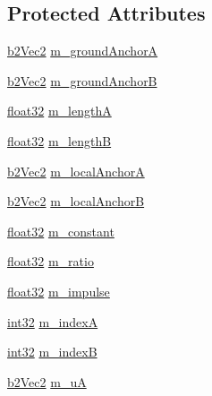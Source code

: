 \subsection*{Protected Attributes}
\begin{DoxyCompactItemize}
\item 
\mbox{\hyperlink{structb2_vec2}{b2\+Vec2}} \mbox{\hyperlink{classb2_pulley_joint_a13456d1c62a4e96e8247988152be4166}{m\+\_\+ground\+AnchorA}}
\item 
\mbox{\hyperlink{structb2_vec2}{b2\+Vec2}} \mbox{\hyperlink{classb2_pulley_joint_a9cc8195bf4e2d53606db0b49d9fc1cbc}{m\+\_\+ground\+AnchorB}}
\item 
\mbox{\hyperlink{b2_settings_8h_aacdc525d6f7bddb3ae95d5c311bd06a1}{float32}} \mbox{\hyperlink{classb2_pulley_joint_a26f2565f804692553e6b96e58621dbc9}{m\+\_\+lengthA}}
\item 
\mbox{\hyperlink{b2_settings_8h_aacdc525d6f7bddb3ae95d5c311bd06a1}{float32}} \mbox{\hyperlink{classb2_pulley_joint_aa44e84a3eed2ded26fca07281e247bbd}{m\+\_\+lengthB}}
\item 
\mbox{\hyperlink{structb2_vec2}{b2\+Vec2}} \mbox{\hyperlink{classb2_pulley_joint_a58cb3464ba25236e316b35d66e92366f}{m\+\_\+local\+AnchorA}}
\item 
\mbox{\hyperlink{structb2_vec2}{b2\+Vec2}} \mbox{\hyperlink{classb2_pulley_joint_af643cf90fb22709fe410164d8a46ea50}{m\+\_\+local\+AnchorB}}
\item 
\mbox{\hyperlink{b2_settings_8h_aacdc525d6f7bddb3ae95d5c311bd06a1}{float32}} \mbox{\hyperlink{classb2_pulley_joint_a0e73d1d31126331267a1661beb146bc7}{m\+\_\+constant}}
\item 
\mbox{\hyperlink{b2_settings_8h_aacdc525d6f7bddb3ae95d5c311bd06a1}{float32}} \mbox{\hyperlink{classb2_pulley_joint_aa44594b9b4826c565da387bed5f02470}{m\+\_\+ratio}}
\item 
\mbox{\hyperlink{b2_settings_8h_aacdc525d6f7bddb3ae95d5c311bd06a1}{float32}} \mbox{\hyperlink{classb2_pulley_joint_a1e5b5fff8b1564688b38d139c5f7c65a}{m\+\_\+impulse}}
\item 
\mbox{\hyperlink{b2_settings_8h_a43d43196463bde49cb067f5c20ab8481}{int32}} \mbox{\hyperlink{classb2_pulley_joint_a6ef68a1d29ef264d4c2ab2d363d9eb97}{m\+\_\+indexA}}
\item 
\mbox{\hyperlink{b2_settings_8h_a43d43196463bde49cb067f5c20ab8481}{int32}} \mbox{\hyperlink{classb2_pulley_joint_acbeb702d3db8a9560d9d1d57ebb1e7f2}{m\+\_\+indexB}}
\item 
\mbox{\hyperlink{structb2_vec2}{b2\+Vec2}} \mbox{\hyperlink{classb2_pulley_joint_a8b49167603509d296aa8d04e46b13658}{m\+\_\+uA}}

\end{DoxyCompactItemize}
